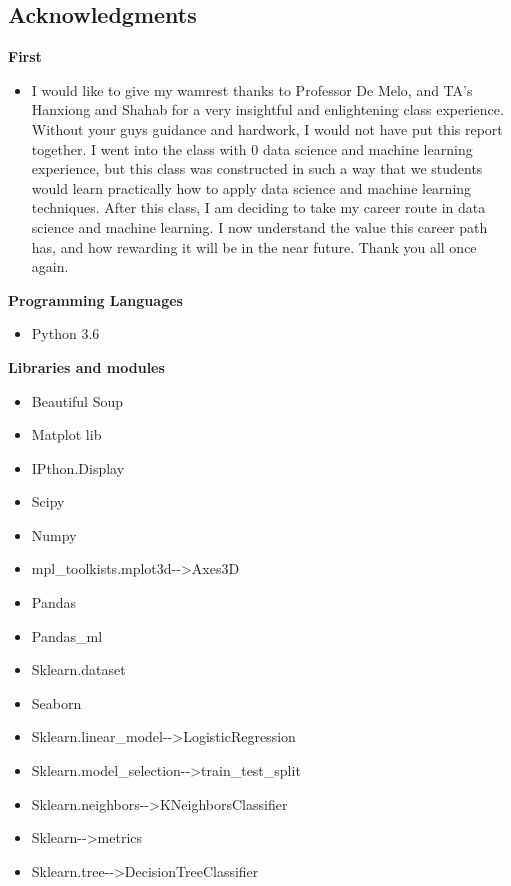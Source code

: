 \documentclass[11pt]{article}
\providecommand{\tightlist}{%
      \setlength{\itemsep}{0pt}\setlength{\parskip}{0pt}}
\begin{document}
    \subsection{Acknowledgments}\label{acknowledgments}

\textbf{First} \newline

\begin{itemize}
\tightlist
\item
  I would like to give my wamrest thanks to Professor De Melo, and TA's
  Hanxiong and Shahab for a very insightful and enlightening class
  experience. Without your guys guidance and hardwork, I would not have
  put this report together. I went into the class with 0 data science
  and machine learning experience, but this class was constructed in
  such a way that we students would learn practically how to apply data
  science and machine learning techniques. After this class, I am
  deciding to take my career route in data science and machine learning.
  I now understand the value this career path has, and how rewarding it
  will be in the near future. Thank you all once again.
\end{itemize}

\textbf{Programming Languages} \newline

\begin{itemize}
\tightlist
\item
  Python 3.6
\end{itemize}

\textbf{Libraries and modules} \newline

\begin{itemize}
\tightlist
\item
  Beautiful Soup
\item
  Matplot lib
\item
  IPthon.Display
\item
  Scipy
\item
  Numpy
\item
  mpl\_toolkists.mplot3d-\/-\textgreater{}Axes3D
\item
  Pandas
\item
  Pandas\_ml
\item
  Sklearn.dataset
\item
  Seaborn
\item
  Sklearn.linear\_model-\/-\textgreater{}LogisticRegression
\item
  Sklearn.model\_selection-\/-\textgreater{}train\_test\_split
\item
  Sklearn.neighbors-\/-\textgreater{}KNeighborsClassifier
\item
  Sklearn-\/-\textgreater{}metrics
\item
  Sklearn.tree-\/-\textgreater{}DecisionTreeClassifier
\end{itemize}
\end{document}
